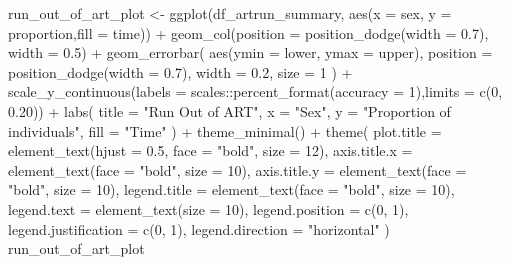 \documentclass[
  letterpaper,
  DIV=11,
  numbers=noendperiod]{scrartcl}
\newenvironment{Shaded}{\begin{snugshade}}{\end{snugshade}}
\newcommand{\AttributeTok}[1]{\textcolor[rgb]{0.40,0.45,0.13}{#1}}
\newcommand{\DecValTok}[1]{\textcolor[rgb]{0.68,0.00,0.00}{#1}}
\newcommand{\FloatTok}[1]{\textcolor[rgb]{0.68,0.00,0.00}{#1}}
\newcommand{\FunctionTok}[1]{\textcolor[rgb]{0.28,0.35,0.67}{#1}}
\newcommand{\NormalTok}[1]{\textcolor[rgb]{0.00,0.23,0.31}{#1}}
\newcommand{\OtherTok}[1]{\textcolor[rgb]{0.00,0.23,0.31}{#1}}
\newcommand{\SpecialCharTok}[1]{\textcolor[rgb]{0.37,0.37,0.37}{#1}}
\newcommand{\StringTok}[1]{\textcolor[rgb]{0.13,0.47,0.30}{#1}}
\begin{document}
\begin{Shaded}
\begin{Highlighting}[]
\NormalTok{run\_out\_of\_art\_plot }\OtherTok{\textless{}{-}} \FunctionTok{ggplot}\NormalTok{(df\_artrun\_summary, }\FunctionTok{aes}\NormalTok{(}\AttributeTok{x =}\NormalTok{ sex, }\AttributeTok{y =}\NormalTok{ proportion,}\AttributeTok{fill =}\NormalTok{ time)) }\SpecialCharTok{+}
  \FunctionTok{geom\_col}\NormalTok{(}\AttributeTok{position =} \FunctionTok{position\_dodge}\NormalTok{(}\AttributeTok{width =} \FloatTok{0.7}\NormalTok{), }\AttributeTok{width =} \FloatTok{0.5}\NormalTok{) }\SpecialCharTok{+}
  \FunctionTok{geom\_errorbar}\NormalTok{(}
    \FunctionTok{aes}\NormalTok{(}\AttributeTok{ymin =}\NormalTok{ lower, }\AttributeTok{ymax =}\NormalTok{ upper),}
    \AttributeTok{position =} \FunctionTok{position\_dodge}\NormalTok{(}\AttributeTok{width =} \FloatTok{0.7}\NormalTok{),}
    \AttributeTok{width =} \FloatTok{0.2}\NormalTok{,}
    \AttributeTok{size =} \DecValTok{1}
\NormalTok{  ) }\SpecialCharTok{+}
  \FunctionTok{scale\_y\_continuous}\NormalTok{(}\AttributeTok{labels =}\NormalTok{ scales}\SpecialCharTok{::}\FunctionTok{percent\_format}\NormalTok{(}\AttributeTok{accuracy =} \DecValTok{1}\NormalTok{),}\AttributeTok{limits =} \FunctionTok{c}\NormalTok{(}\DecValTok{0}\NormalTok{, }\FloatTok{0.20}\NormalTok{)) }\SpecialCharTok{+}
  \FunctionTok{labs}\NormalTok{(}
    \AttributeTok{title =} \StringTok{"Run Out of ART"}\NormalTok{,}
    \AttributeTok{x =} \StringTok{"Sex"}\NormalTok{,}
    \AttributeTok{y =} \StringTok{"Proportion of individuals"}\NormalTok{,}
    \AttributeTok{fill =} \StringTok{"Time"}
\NormalTok{  ) }\SpecialCharTok{+}
  \FunctionTok{theme\_minimal}\NormalTok{() }\SpecialCharTok{+}
  \FunctionTok{theme}\NormalTok{(}
    \AttributeTok{plot.title =} \FunctionTok{element\_text}\NormalTok{(}\AttributeTok{hjust =} \FloatTok{0.5}\NormalTok{, }\AttributeTok{face =} \StringTok{"bold"}\NormalTok{, }\AttributeTok{size =} \DecValTok{12}\NormalTok{),}
    \AttributeTok{axis.title.x =} \FunctionTok{element\_text}\NormalTok{(}\AttributeTok{face =} \StringTok{"bold"}\NormalTok{, }\AttributeTok{size =} \DecValTok{10}\NormalTok{),}
    \AttributeTok{axis.title.y =} \FunctionTok{element\_text}\NormalTok{(}\AttributeTok{face =} \StringTok{"bold"}\NormalTok{, }\AttributeTok{size =} \DecValTok{10}\NormalTok{),}
    \AttributeTok{legend.title =} \FunctionTok{element\_text}\NormalTok{(}\AttributeTok{face =} \StringTok{"bold"}\NormalTok{, }\AttributeTok{size =} \DecValTok{10}\NormalTok{),}
    \AttributeTok{legend.text =} \FunctionTok{element\_text}\NormalTok{(}\AttributeTok{size =} \DecValTok{10}\NormalTok{),}
    \AttributeTok{legend.position =} \FunctionTok{c}\NormalTok{(}\DecValTok{0}\NormalTok{, }\DecValTok{1}\NormalTok{),}
    \AttributeTok{legend.justification =} \FunctionTok{c}\NormalTok{(}\DecValTok{0}\NormalTok{, }\DecValTok{1}\NormalTok{),}
    \AttributeTok{legend.direction =} \StringTok{"horizontal"}
\NormalTok{  )}
\NormalTok{run\_out\_of\_art\_plot}
\end{Highlighting}
\end{Shaded}
\end{document}
